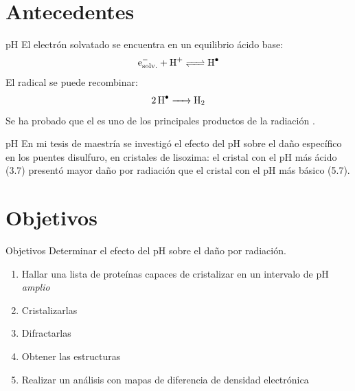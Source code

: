 \documentclass{beamer}
\begin{document}
\section{Antecedentes}
\begin{frame}{pH}
El electrón solvatado se encuentra en un equilibrio ácido base:
\begin{equation*}
\ce{e^{-}_{solv.} + H^{+} <=> H^{.}}
\end{equation*}
El radical  se puede recombinar:
\begin{equation*}
   \ce{2H^{.}      ->        H2}
\end{equation*} 
Se ha probado que el  es uno de los principales productos de la radiación \cite{Meents2010}. 
\end{frame}
\begin{frame}{pH}
En mi tesis de maestría se investigó el efecto del pH sobre el daño específico en los puentes disulfuro, en cristales de lisozima: el cristal con el pH más ácido (3.7) presentó mayor daño por radiación que el cristal con el pH más básico (5.7).
\end{frame}
\section{Objetivos}
\begin{frame}{Objetivos}
	Determinar el efecto del pH sobre el daño por radiación.
\begin{enumerate}
	\item Hallar una lista de proteínas capaces de cristalizar en un intervalo de pH \emph{amplio}
	\item Cristalizarlas
	\item Difractarlas
	\item Obtener las estructuras 
	\item Realizar un análisis con mapas de diferencia de densidad electrónica
\end{enumerate}	
\end{frame}
\end{document}

